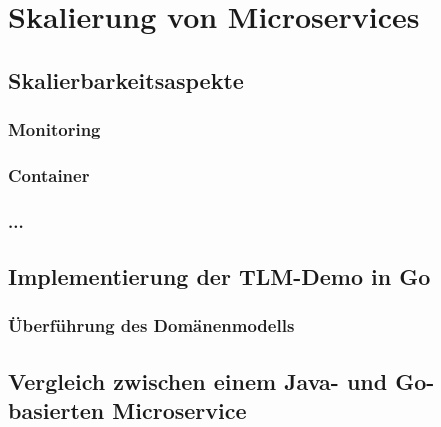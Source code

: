 \chapter{Skalierung von Microservices}

\section{Skalierbarkeitsaspekte}

\subsection{Monitoring}

\subsection{Container}

\subsection{...}

\section{Implementierung der TLM-Demo in Go}

\subsection{Überführung des Domänenmodells}

\section{Vergleich zwischen einem Java- und Go-basierten Microservice}